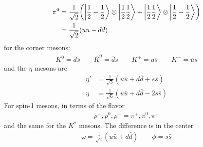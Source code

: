 \documentclass[../main.tex]{subfiles}
\begin{document}
\begin{itemize}
\begin{align*}
        \pi^0 &= \frac{1}{\sqrt{2}}
            \qt(\ket{\ohf -\ohf} \otimes \ket{\ohf \ohf} + \ket{\ohf \ohf} \otimes \ket{\ohf -\ohf})  \\
        &= \frac{1}{\sqrt{2}} (u \bar u - d \bar d)
    \end{align*}
    for the corner mesons:
    \begin{align*}
        K^0 = d \bar s \qquad \bar K^0 = \bar d s \qquad K^+ = u \bar s \qquad K^- = \bar u s
    \end{align*}
    and the $\eta$ mesons are
    \begin{align*}
        \eta' &= \frac{1}{\sqrt{3}} (u \bar u + d \bar d + s \bar s) \\
        \eta &= \frac{1}{\sqrt{6}} (u \bar u + d \bar d - 2s \bar s)
    \end{align*}
    For spin-1 mesons, in terms of the flavor
    \begin{align*}
        \rho^+, \rho^0, \rho^- = \pi^+, \pi^0, \pi^- 
    \end{align*}
    and the same for the $K^*$ mesons. The difference is in the center
    \begin{align*}
        \omega = \frac{1}{\sqrt{2}} (u \bar u + d \bar d) \qquad \phi = s \bar s
    \end{align*}
\end{itemize}
\end{document}
